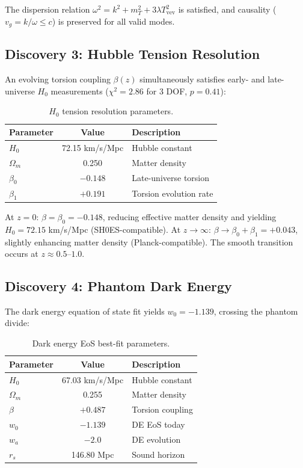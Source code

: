 \documentclass[twocolumn,prd,superscriptaddress,nofootinbib]{revtex4-2}
\begin{document}
The dispersion relation $\omega^2 = k^2 + m_T^2 + 3\lambda T_\text{vev}^2$ is satisfied, and causality ($v_g = k/\omega \leq c$) is preserved for all valid modes.

\subsection{Discovery 3: Hubble Tension Resolution}

An evolving torsion coupling $\beta(z)$ simultaneously satisfies early- and late-universe $H_0$ measurements ($\chi^2 = 2.86$ for 3 DOF, $p = 0.41$):

\begin{table}[h]
\caption{$H_0$ tension resolution parameters.}
\label{tab:h0_params}
\begin{ruledtabular}
\begin{tabular}{lcl}
Parameter & Value & Description \\
\hline
$H_0$ & 72.15 km/s/Mpc & Hubble constant \\
$\Omega_m$ & 0.250 & Matter density \\
$\beta_0$ & $-0.148$ & Late-universe torsion \\
$\beta_1$ & $+0.191$ & Torsion evolution rate \\
\end{tabular}
\end{ruledtabular}
\end{table}

At $z = 0$: $\beta = \beta_0 = -0.148$, reducing effective matter density and yielding $H_0 = 72.15$ km/s/Mpc (SH0ES-compatible). At $z \to \infty$: $\beta \to \beta_0 + \beta_1 = +0.043$, slightly enhancing matter density (Planck-compatible). The smooth transition occurs at $z \approx 0.5$--$1.0$.

\subsection{Discovery 4: Phantom Dark Energy}

The dark energy equation of state fit yields $w_0 = -1.139$, crossing the phantom divide:

\begin{table}[h]
\caption{Dark energy EoS best-fit parameters.}
\label{tab:de_params}
\begin{ruledtabular}
\begin{tabular}{lcl}
Parameter & Value & Description \\
\hline
$H_0$ & 67.03 km/s/Mpc & Hubble constant \\
$\Omega_m$ & 0.255 & Matter density \\
$\beta$ & $+0.487$ & Torsion coupling \\
$w_0$ & $-1.139$ & DE EoS today \\
$w_a$ & $-2.0$ & DE evolution \\
$r_s$ & 146.80 Mpc & Sound horizon \\
\end{tabular}
\end{ruledtabular}
\end{table}
\end{document}
